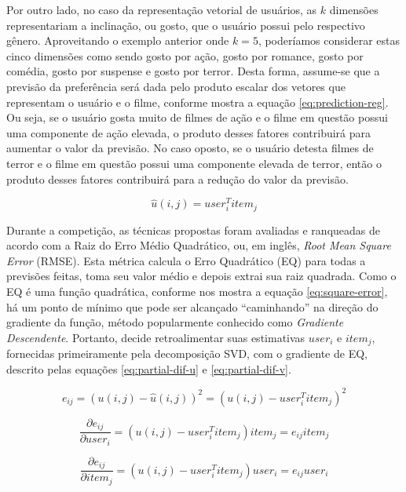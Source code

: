 Por outro lado, no caso da representação vetorial de usuários, as $k$ dimensões representariam a inclinação, ou gosto, que o usuário possui pelo respectivo gênero. Aproveitando o exemplo anterior onde $k=5$, poderíamos considerar estas cinco dimensões como sendo gosto por ação, gosto por romance, gosto por comédia, gosto por suspense e gosto por terror. Desta forma, assume-se que a previsão da preferência será dada pelo produto escalar dos vetores que representam o usuário e o filme, conforme mostra a equação \ref{eq:prediction-reg}. Ou seja, se o usuário gosta muito de filmes de ação e o filme em questão possui uma componente de ação elevada, o produto desses fatores contribuirá para aumentar o valor da previsão. No caso oposto, se o usuário detesta filmes de terror e o filme em questão possui uma componente elevada de terror, então o produto desses fatores contribuirá para a redução do valor da previsão.

\begin{equation}
\hat{u}(i,j) = user_{i}^{T}item_{j}
\label{eq:prediction-reg}
\end{equation}

Durante a competição, as técnicas propostas foram avaliadas e ranqueadas de acordo com a Raiz do Erro Médio Quadrático, ou, em inglês, \textit{Root Mean Square Error} (RMSE). Esta métrica calcula o Erro Quadrático (EQ) para todas a previsões feitas, toma seu valor médio e depois extrai sua raiz quadrada. Como o EQ é uma função quadrática, conforme nos mostra a equação \ref{eq:square-error}, há um ponto de mínimo que pode ser alcançado ``caminhando'' na direção do gradiente da função, método popularmente conhecido como \textit{Gradiente Descendente}. Portanto, \citep{Funk:2006:Online} decide retroalimentar suas estimativas $user_i$ e $item_j$, fornecidas primeiramente pela decomposição SVD, com o gradiente de EQ, descrito pelas equações \ref{eq:partial-dif-u} e \ref{eq:partial-dif-v}.

\begin{equation}
e_{ij} = \left( u(i,j) - \hat{u}(i,j) \right)^2 = \left( u(i,j) - user_{i}^{T}item_{j} \right)^2
\label{eq:square-error}
\end{equation}

\begin{equation}
\frac{\partial e_{ij}}{\partial user_i} = \left( u(i,j) - user_{i}^{T}item_{j} \right) item_j = e_{ij} item_j
\label{eq:partial-dif-u}
\end{equation}

\begin{equation}
\frac{\partial e_{ij}}{\partial item_j} = \left( u(i,j) - user_{i}^{T}item_{j} \right) user_i = e_{ij} user_i
\label{eq:partial-dif-v}
\end{equation}

